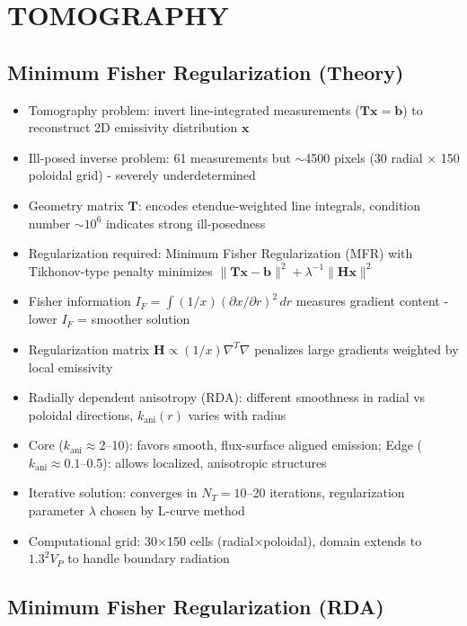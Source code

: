 \documentclass[11pt,a4paper]{article}
\begin{document}
\section{TOMOGRAPHY}

\subsection{Minimum Fisher Regularization (Theory)}

\begin{itemize}
\item Tomography problem: invert line-integrated measurements ($\mathbf{T}\mathbf{x}=\mathbf{b}$) to reconstruct 2D emissivity distribution $\mathbf{x}$
\item Ill-posed inverse problem: 61 measurements but $\sim$4500 pixels (30 radial $\times$ 150 poloidal grid) - severely underdetermined
\item Geometry matrix $\mathbf{T}$: encodes etendue-weighted line integrals, condition number $\sim10^6$ indicates strong ill-posedness
\item Regularization required: Minimum Fisher Regularization (MFR) with Tikhonov-type penalty minimizes $\|\mathbf{T}\mathbf{x}-\mathbf{b}\|^2 + \lambda^{-1}\|\mathbf{H}\mathbf{x}\|^2$
\item Fisher information $I_F = \int(1/x)(\partial x/\partial r)^2\,dr$ measures gradient content - lower $I_F$ = smoother solution
\item Regularization matrix $\mathbf{H} \propto (1/x)\nabla^T\nabla$ penalizes large gradients weighted by local emissivity
\item Radially dependent anisotropy (RDA): different smoothness in radial vs poloidal directions, $k_{\text{ani}}(r)$ varies with radius
\item Core ($k_{\text{ani}}\approx2$--10): favors smooth, flux-surface aligned emission; Edge ($k_{\text{ani}}\approx0.1$--0.5): allows localized, anisotropic structures
\item Iterative solution: converges in $N_T=10$--20 iterations, regularization parameter $\lambda$ chosen by L-curve method
\item Computational grid: 30$\times$150 cells (radial$\times$poloidal), domain extends to $1.3^2V_P$ to handle boundary radiation
\end{itemize}

\subsection{Minimum Fisher Regularization (RDA)}
\end{document}
